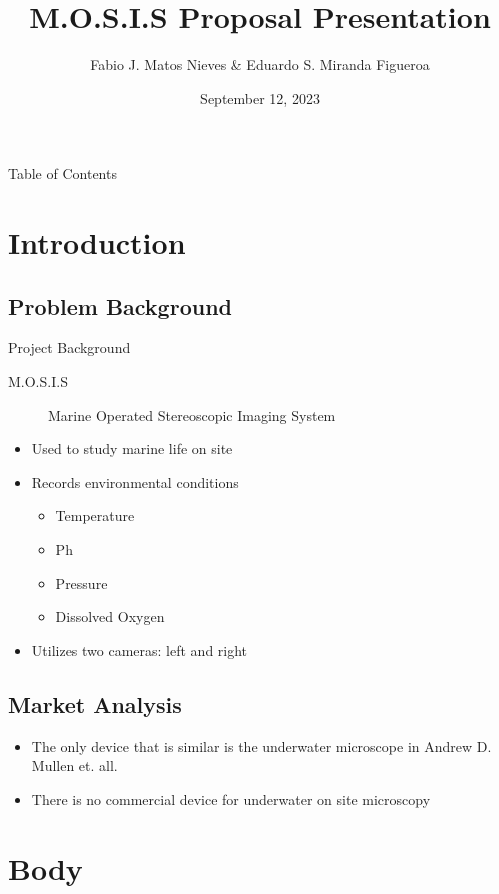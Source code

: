 \documentclass[14pt, aspectratio=169]{beamer}
\title{M.O.S.I.S Proposal Presentation}
\author{Fabio J. Matos Nieves \& Eduardo S. Miranda Figueroa }
\institute{Univerity of Puerto Rico Mayagüez Campus}
\date{September 12, 2023}
\begin{document}
\begin{frame}
	\maketitle
\end{frame}

\begin{frame}{Table of Contents}
	\tableofcontents
\end{frame}
\section{Introduction}
\subsection{Problem Background}
\begin{frame}{Project Background}
	\begin{description}
		\item[M.O.S.I.S] Marine Operated Stereoscopic Imaging System
	\end{description}
	\begin{itemize}
		\item Used to study marine life on site
		\item Records environmental conditions
		      \begin{itemize}
			      \item Temperature
			      \item Ph
			      \item Pressure
			      \item Dissolved Oxygen
		      \end{itemize}
		\item Utilizes two cameras: left and right
	\end{itemize}
\end{frame}
\subsection{Market Analysis}
\begin{itemize}
	\item The only device that is similar is the underwater microscope in Andrew D. Mullen et. all.
	\item There is no commercial device for underwater on site microscopy
\end{itemize}
\section{Body}
\end{document}
